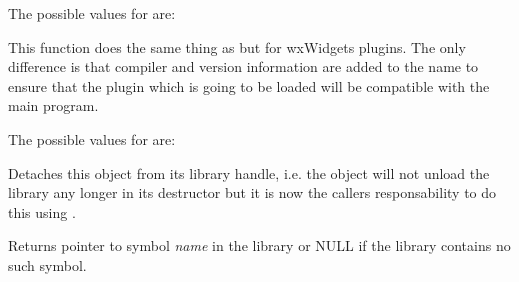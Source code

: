 The possible values for  are:

\begin{twocollist}
\end{twocollist}





\label{wxdynamiclibrarycanonicalizepluginname}


This function does the same thing as 
 but for wxWidgets
plugins. The only difference is that compiler and version information are added
to the name to ensure that the plugin which is going to be loaded will be
compatible with the main program.

The possible values for  are:

\begin{twocollist}
\end{twocollist}


\label{wxdynamiclibrarydetach}


Detaches this object from its library handle, i.e. the object will not unload
the library any longer in its destructor but it is now the callers
responsability to do this using .


\label{wxdynamiclibrarygetsymbol}


Returns pointer to symbol {\it name} in the library or NULL if the library
contains no such symbol.




\label{wxdynamiclibraryhassymbol}

